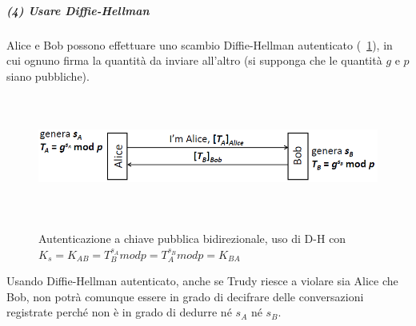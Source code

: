 \subparagraph{(4) Usare Diffie-Hellman}
Alice e Bob possono effettuare uno scambio Diffie-Hellman autenticato (\figurename~\ref{fig:ImgS77bis}), in cui ognuno firma la quantità da inviare all'altro (si supponga che le quantità $g$ e $p$ siano pubbliche).
\begin{figure}[htbp]
	\centering%
	\subfigure%
	{\includegraphics[height=4cm, width=12cm, keepaspectratio]{Immagini/autenticazione/ImgS77bis.png}}
	\caption{Autenticazione a chiave pubblica bidirezionale, uso di D-H con $K_{s} = K_{AB} = T_{B}^{s_{A}}modp = T_{A}^{s_{B}}modp = K_{BA}$}\label{fig:ImgS77bis} 	
\end{figure}
Usando Diffie-Hellman autenticato, anche se Trudy riesce a violare sia Alice che Bob, non potrà comunque essere in grado di decifrare delle conversazioni registrate perché non è in grado di dedurre né $s_{A}$ né $s_{B}$.

